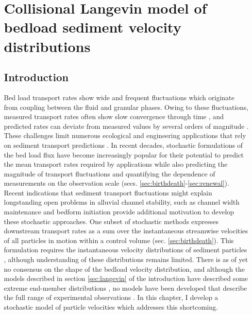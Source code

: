 
\chapter{Collisional Langevin model of bedload sediment velocity distributions}
\label{ch:langevin}
\section{Introduction}

Bed load transport rates show wide and frequent fluctuations which originate from coupling between the fluid and granular phases.
Owing to these fluctuations, measured transport rates often show slow convergence through time \citep{Dhont2018,Turowski2010}, and predicted rates can deviate from measured values by several orders of magnitude \citep{Recking2012,Martin2003}.
These challenges limit numerous ecological and engineering applications that rely on sediment transport predictions \citep{Gaeuman2017,Malmon2005}.
In recent decades, stochastic formulations of the bed load flux have become increasingly popular for their potential to predict the mean transport rates required by applications while also predicting the magnitude of transport fluctuations and quantifying the dependence of measurements on the observation scale (secs. \ref{sec:birthdeath}-\ref{sec:renewal}).
Recent indications that sediment transport fluctuations might explain longstanding open problems in alluvial channel stability, such as channel width maintenance \citep{Abramian2019,Abramian2020} and bedform initiation \citep{Jerolmack2005,Bohorquez2016} provide additional motivation to develop these stochastic approaches.
One subset of stochastic methods expresses downstream transport rates as a sum over the instantaneous streamwise velocities of all particles in motion within a control volume (sec. \ref{sec:birthdeath}).
This formulation requires the instantaneous velocity distributions of sediment particles \citep{Lajeunesse2010}, although understanding of these distributions remains limited.
There is as of yet no consensus on the shape of the bedload velocity distribution, and although the models described in section \ref{sec:langevin} of the introduction have described some extreme end-member distributions \citep[e.g.][]{Fan2014,Ancey2014}, no models have been developed that describe the full range of experimental observations \citep{Lajeunesse2010,Fathel2015,Heyman2016,Liu2019,Houssais2012}.
In this chapter, I develop a stochastic model of particle velocities which addresses this shortcoming.

